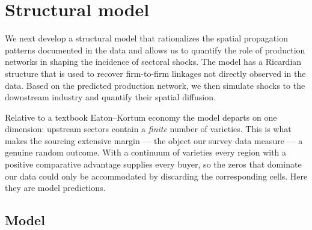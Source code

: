 %
%

\section{Structural model}
\label{sec:model}

We next develop a structural model that rationalizes the spatial propagation patterns
documented in the data and allows us to quantify the role of production networks in shaping
the incidence of sectoral shocks. The model has a Ricardian structure that is used to recover
firm-to-firm linkages not directly observed in the data. Based on the predicted production
network, we then simulate shocks to the downstream industry and quantify their spatial
diffusion.

Relative to a textbook Eaton--Kortum economy the model departs on one dimension: upstream
sectors contain a \emph{finite} number of varieties. This is what makes the sourcing extensive
margin --- the object our survey data measure --- a genuine random outcome. With a continuum of
varieties every region with a positive comparative advantage supplies every buyer, so the
zeros that dominate our data could only be accommodated by discarding the corresponding cells.
Here they are model predictions.

\subsection{Model}
\label{sec:model-model}

